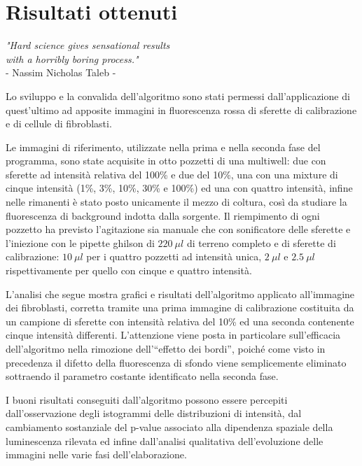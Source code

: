 \clearpage{\pagestyle{empty}\cleardoublepage}

\chapter{Risultati ottenuti}

\begin{flushright}\begin{small}\textit{"Hard science gives sensational results\\ with a horribly boring process."}\\
- Nassim Nicholas Taleb -\\
\end{small}\end{flushright}

Lo sviluppo e la convalida dell'algoritmo sono stati permessi dall'applicazione di quest'ultimo ad apposite immagini in fluorescenza rossa di sferette di calibrazione e di cellule di fibroblasti.

Le immagini di riferimento, utilizzate nella prima e nella seconda fase del programma, sono state acquisite in otto pozzetti di una multiwell: due con sferette ad intensità relativa del 100\% e due del 10\%, una con una mixture di cinque intensità (1\%, 3\%, 10\%, 30\% e 100\%) ed una con quattro intensità, infine nelle rimanenti è stato posto unicamente il mezzo di coltura, così da studiare la fluorescenza di background indotta dalla sorgente.
Il riempimento di ogni pozzetto ha previsto l'agitazione sia manuale che con sonificatore delle sferette e l'iniezione con le pipette ghilson di $220\ \mu l$ di terreno completo e di sferette di calibrazione: $10\ \mu l$ per i quattro pozzetti ad intensità unica, $2\ \mu l$ e $2.5\ \mu l$ rispettivamente per quello con cinque e quattro intensità.

L'analisi che segue mostra grafici e risultati dell'algoritmo applicato all'immagine dei fibroblasti, corretta tramite una prima immagine di calibrazione costituita da un campione di sferette con intensità relativa del 10\% ed una seconda contenente cinque intensità differenti. 
L'attenzione viene posta in particolare sull'efficacia dell'algoritmo nella rimozione dell'``effetto dei bordi'', poiché come visto in precedenza il difetto della fluorescenza di sfondo viene semplicemente eliminato sottraendo il parametro costante identificato nella seconda fase.

I buoni risultati conseguiti dall'algoritmo possono essere percepiti dall'osservazione degli istogrammi delle distribuzioni di intensità, dal cambiamento sostanziale del p-value associato alla dipendenza spaziale della luminescenza rilevata ed infine dall'analisi qualitativa dell'evoluzione delle immagini nelle varie fasi dell'elaborazione.

